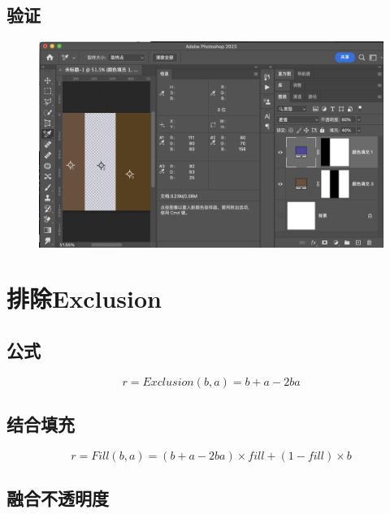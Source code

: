 \subsection{ 验证}
\begin{figure}[h!]
	\centering
	\includegraphics[width=\linewidth]{figure/difference}
	\caption{}
	\label{fig:difference}
\end{figure}
%
%

\section{ 排除Exclusion}

\subsection{ 公式}

\begin{equation}r=Exclusion(b,a)=b+a-2ba\end{equation}

\subsection{ 结合填充}

\begin{equation}r=Fill(b,a)=(b+a-2ba)\times fill + (1-fill)\times b\end{equation}

\subsection{ 融合不透明度}

